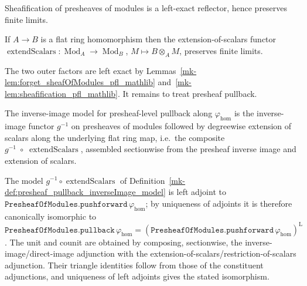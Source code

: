 \begin{lemma}
  \label{mk-lem:sheafification_pfl_mathlib}
  \mathlibok

  Sheafification of presheaves of modules is a left-exact reflector, hence preserves
  finite limits.
\end{lemma}

\begin{lemma}
  \label{mk-lem:extendScalars_pfl_flat_mathlib}
  \mathlibok

  If \(A \to B\) is a flat ring homomorphism then the extension-of-scalars functor
  \(\operatorname{extendScalars} : \operatorname{Mod}_A \to \operatorname{Mod}_B\),
  \(M \mapsto B \otimes_A M\), preserves finite limits.
\end{lemma}

The two outer factors are left exact by
Lemmas~\ref{mk-lem:forget_sheafOfModules_pfl_mathlib}
and~\ref{mk-lem:sheafification_pfl_mathlib}. It remains to treat presheaf pullback.

\begin{definition}
  \label{mk-def:presheaf_pullback_inverseImage_model}
  The inverse-image model for presheaf-level pullback along \(\varphi_{\mathrm{hom}}\) is
  the inverse-image functor \(g^{-1}\) on presheaves of modules followed by degreewise
  extension of scalars along the underlying flat ring map, i.e.\ the composite
  \(g^{-1} \;\circ\; \operatorname{extendScalars}\), assembled sectionwise from the
  presheaf inverse image and extension of scalars.
\end{definition}

\begin{lemma}
  \label{mk-lem:presheaf_pullback_inverseImage_adjoint}
  The model \(g^{-1} \circ \operatorname{extendScalars}\) of
  Definition~\ref{mk-def:presheaf_pullback_inverseImage_model} is left adjoint to
  \(\texttt{PresheafOfModules.pushforward}\,\varphi_{\mathrm{hom}}\); by uniqueness of
  adjoints it is therefore canonically isomorphic to
  \(\texttt{PresheafOfModules.pullback}\,\varphi_{\mathrm{hom}}
  = (\texttt{PresheafOfModules.pushforward}\,\varphi_{\mathrm{hom}})^{\mathrm{L}}\).
  The unit and counit are obtained by composing, sectionwise, the
  inverse-image/direct-image adjunction with the extension-of-scalars/restriction-of-scalars
  adjunction. Their triangle identities follow from those of the constituent
  adjunctions, and uniqueness of left adjoints gives the stated isomorphism.
\end{lemma}

